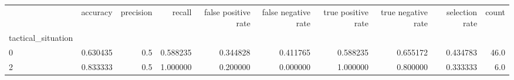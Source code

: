 \begin{tabular}{lrrrrrrrrr}
\toprule
{} &  accuracy &  precision &    recall &  false positive rate &  false negative rate &  true positive rate &  true negative rate &  selection rate &  count \\
tactical\_situation &           &            &           &                      &                      &                     &                     &                 &        \\
\midrule
0                  &  0.630435 &        0.5 &  0.588235 &             0.344828 &             0.411765 &            0.588235 &            0.655172 &        0.434783 &   46.0 \\
2                  &  0.833333 &        0.5 &  1.000000 &             0.200000 &             0.000000 &            1.000000 &            0.800000 &        0.333333 &    6.0 \\
\bottomrule
\end{tabular}
